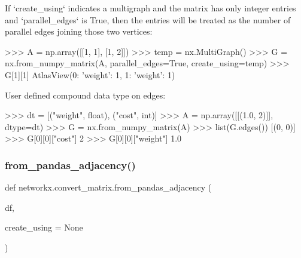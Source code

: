 \begin{DoxyVerb}
If `create_using` indicates a multigraph and the matrix has only integer
entries and `parallel_edges` is True, then the entries will be treated
as the number of parallel edges joining those two vertices:

>>> A = np.array([[1, 1], [1, 2]])
>>> temp = nx.MultiGraph()
>>> G = nx.from_numpy_matrix(A, parallel_edges=True, create_using=temp)
>>> G[1][1]
AtlasView({0: {'weight': 1}, 1: {'weight': 1}})

User defined compound data type on edges:

>>> dt = [("weight", float), ("cost", int)]
>>> A = np.array([[(1.0, 2)]], dtype=dt)
>>> G = nx.from_numpy_matrix(A)
>>> list(G.edges())
[(0, 0)]
>>> G[0][0]["cost"]
2
>>> G[0][0]["weight"]
1.0\end{DoxyVerb}
 \mbox{\label{namespacenetworkx_1_1convert__matrix_a566eb7823aed0eeb25556218a8aac8aa}} 
\subsubsection{\texorpdfstring{from\+\_\+pandas\+\_\+adjacency()}{from\_pandas\_adjacency()}}
{\footnotesize\ttfamily def networkx.\+convert\+\_\+matrix.\+from\+\_\+pandas\+\_\+adjacency (\begin{DoxyParamCaption}\item[{}]{df,  }\item[{}]{create\+\_\+using = {\ttfamily None} }\end{DoxyParamCaption})}

